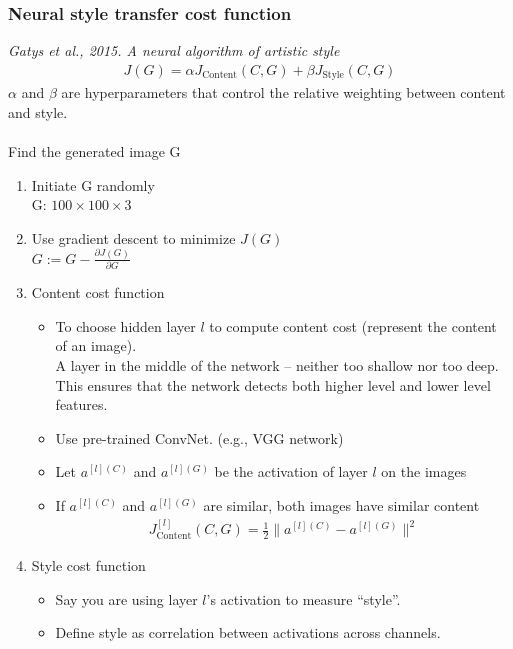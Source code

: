 \subsubsection{Neural style transfer cost function}
\textit{Gatys et al., 2015. A neural algorithm of artistic style}\\
\begin{align}
J(G) = \alpha J_{\text{Content}}(C, G) + \beta J_{\text{Style}}(C, G)
\end{align}
$\alpha$ and $\beta$ are hyperparameters that control the relative weighting between content and style.\\
~\\
Find the generated image G

\begin{enumerate}
\item
    Initiate G randomly\\
    G: $100 \times 100 \times 3$
\item
    Use gradient descent to minimize $J(G)$\\
    $G := G -  \frac{\partial J(G)}{\partial G}$
\item
    Content cost function
    \begin{itemize}
     \item
        To choose hidden layer $l$ to compute content cost (represent the content of an image).\\
        A layer in the middle of the network -- neither too shallow nor too deep. This ensures that the network detects both higher 	    level and lower level features.
    \item
        Use pre-trained ConvNet. (e.g., VGG network)
    \item
        Let $a^{[l](C)}$ and $a^{[l](G)}$ be the activation of layer $l$ on the images
    \item
        If $a^{[l](C)}$ and $a^{[l](G)}$ are similar, both images have similar content
        \begin{align}
        J_{\text{Content}}^{[l]}(C, G) = \frac{1}{2}\lVert a^{[l](C)} - a^{[l](G)}\rVert^2
        \end{align}    
    \end{itemize}
\item
    Style cost function
    \begin{itemize}
    \item
    Say you are using layer $l$'s activation to measure ``style''.
    \item
    Define style as correlation between activations across channels.\\

\end{itemize}
\end{enumerate}
